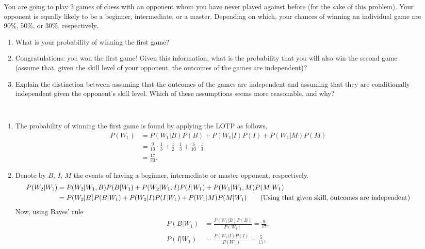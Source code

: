 

\setcounter{theorem}{16}
\begin{exercise}[BH.2.35]
  You are going to play 2 games of chess with an opponent whom you have never played against before (for the sake of this problem). Your opponent is equally likely to be a beginner, intermediate, or a master. Depending on which, your chances of winning an individual game are 90\%, 50\%, or 30\%, respectively.
	\begin{enumerate}
		\item What is your probability of winning the first game?
		\item Congratulations: you won the first game! Given this information, what is the probability that you will also win the second game (assume that, given the skill level of your opponent, the outcomes of the games are independent)?
		\item Explain the distinction between assuming that the outcomes of the games are independent and assuming that they are conditionally independent given the opponent's skill level. Which of these assumptions seems more reasonable, and why?
	\end{enumerate}
\begin{solution}~
	\begin{enumerate}
		\item The probability of winning the first game is found by applying the LOTP as follows,
		\begin{align*}
			P(W_{1}) &= P(W_{1}|B)P(B) + P(W_{1}|I)P(I) + P(W_{1}|M)P(M)\\
			& = \frac{9}{10}\cdot\frac{1}{3} + \frac{1}{2}\cdot\frac{1}{3} + \frac{3}{10}\cdot\frac{1}{3}\\
			& = \frac{17}{30}.
		\end{align*}
		\item Denote by $B$, $I$, $M$ the events of having a beginner, intermediate or master opponent, respectively.
		\begin{align*}
			P(W_{2}|W_{1}) &= P(W_{2}|W_{1},B)P(B|W_{1}) + P(W_{2}|W_{1},I)P(I|W_{1}) + P(W_{1}|W_{1},M)P(M|W_{1})\\
			&= P(W_{2}|B)P(B|W_{1}) + P(W_{2}|I)P(I|W_{1}) + P(W_{1}|M)P(M|W_{1})\tag*{(\text{Using that given skill, outcomes are independent})}
		\end{align*}
		Now, using Bayes' rule
		\begin{align*}
			P(B|W_{1})&=\frac{P(W_{1}|B)P(B)}{P(W_{1})}=\frac{9}{17},\\
			P(I|W_{1})&=\frac{P(W_{1}|I)P(I)}{P(W_{1})}=\frac{5}{17},\\

\end{align*}
\end{enumerate}
\end{solution}
\end{exercise}
